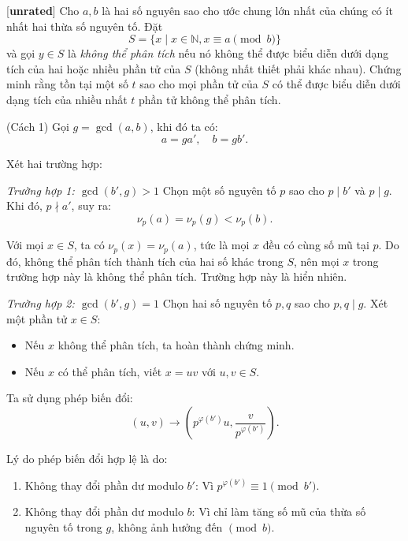 \documentclass[../05-largest-exponent.tex]{subfiles}
\begin{document}
\begin{example*}\label{example:CHN-2015-TST3-D1-P3}[\textbf{unrated}]
	Cho \( a, b \) là hai số nguyên sao cho ước chung lớn nhất của chúng có ít nhất hai thừa số nguyên tố.  
	Đặt  
	\[
		S = \{ x \mid x \in \mathbb{N}, x \equiv a \pmod{b} \}
	\]
	và gọi \( y \in S \) là \textit{không thể phân tích} nếu nó không thể được biểu diễn
	dưới dạng tích của hai hoặc nhiều phần tử của \( S \) (không nhất thiết phải khác nhau).  
	Chứng minh rằng tồn tại một số \( t \) sao cho mọi phần tử của \( S \) có thể được biểu diễn
	dưới dạng tích của nhiều nhất \( t \) phần tử không thể phân tích.
\end{example*}

\begin{soln}(Cách 1)\footnotemark
	Gọi \( g = \gcd(a, b) \), khi đó ta có:
	\[
		a = g a', \quad b = g b'.
	\]
	
	Xét hai trường hợp:

	\textit{Trường hợp 1: \( \gcd(b', g) > 1 \)}
	Chọn một số nguyên tố \( p \) sao cho \( p \mid b' \) và \( p \mid g \). Khi đó, \( p \nmid a' \), suy ra:
	\[
		\nu_p(a) = \nu_p(g) < \nu_p(b).
	\]
	
	Với mọi \( x \in S \), ta có \( \nu_p(x) = \nu_p(a) \), tức là mọi \( x \) đều có cùng số mũ tại \( p \).
	Do đó, không thể phân tích thành tích của hai số khác trong \( S \), nên mọi \( x \) trong trường hợp này là không thể phân tích.
	Trường hợp này là hiển nhiên.
	
	\textit{Trường hợp 2: \( \gcd(b', g) = 1 \)}
	Chọn hai số nguyên tố \( p, q \) sao cho \( p, q \mid g \). Xét một phần tử \( x \in S \):
	\begin{itemize}[topsep=0pt, partopsep=0pt, itemsep=0pt]
		\item Nếu \( x \) không thể phân tích, ta hoàn thành chứng minh.
		\item Nếu \( x \) có thể phân tích, viết \( x = uv \) với \( u, v \in S \).
	\end{itemize}
	
	Ta sử dụng phép biến đổi:
	\[
		(u, v) \to \left(p^{\varphi(b')} u, \frac{v}{p^{\varphi(b')}}\right).
	\]
	
	Lý do phép biến đổi hợp lệ là do:
	\begin{enumerate}
		\item Không thay đổi phần dư modulo \( b' \): Vì \( p^{\varphi(b')} \equiv 1 \pmod{b'} \).
		\item Không thay đổi phần dư modulo \( b \): Vì chỉ làm tăng số mũ của thừa số nguyên tố trong \( g \), không ảnh hưởng đến \( \pmod{b} \).
	\end{enumerate}
	

\end{soln}
\end{document}
